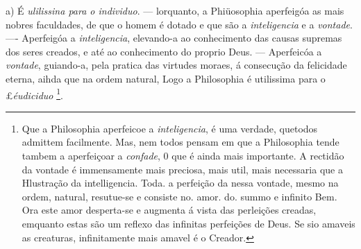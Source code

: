 a) É \emph{ulilissina para o individuo}. --- lorquanto, a Phiüosophia aperfeigóa as mais nobres faculdades, de que o homem é dotado e que são a \emph{inteligencia} e a \emph{vontade}. ---- Aperfeigóa a \emph{inteligencia}, elevando-a ao conhecimento das causas supremas dos seres creados, e até ao conhecimento do proprio Deus. --- Aperfeicóa a \emph{vontade}, guiando-a, pela pratica das virtudes moraes, á consecução da felicidade eterna, aihda que na ordem natural, Logo a Philosophia é utilissima para o £\emph{éudiciduo} \footnote{Que a Philosophia aperfeicoe a \emph{inteligencia}, é uma verdade, quetodos admittem facilmente. Mas, nem todos pensam em que a Philosophia tende tambem a aperfeiçoar a \emph{confade}, 0 que é ainda mais importante. A rectidão da vontade é immensamente mais preciosa, mais util, mais necessaria que a Hlustração da intelligencia. Toda. a perfeição da nessa vontade, mesmo na ordem, natural, resutue-se e consiste no. amor. do. summo e infinito Bem. Ora este amor desperta-se e augmenta á vista das perleições creadas, emquanto estas são um reflexo das infinitas perfeições de Deus. Se sio amaveis as creaturas, infinitamente mais amavel é o Creador.}.


